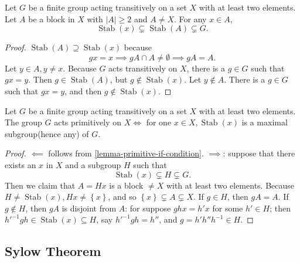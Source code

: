 \begin{lemma}
  \label{lemma-primitive-if-condition}
  Let \( G \) be a finite group acting transitively on a set \( X \) with at least two elements.
  Let \( A \) be a block in \( X \) with \( \left\vert A \right\vert \geq 2 \) and \( A \neq X \).
  For any \( x \in A \),
  \[
    \operatorname{Stab}(x) \subsetneq \operatorname{Stab}(A) \subsetneq G.
  \]
\end{lemma}
\begin{proof}
  \( \operatorname{Stab}(A) \supseteq \operatorname{Stab}(x) \) because
  \[
    gx = x \implies gA \cap A \neq \emptyset \implies gA = A.
  \]
  Let \( y \in A, y \neq x \).
  Because \( G \) acts transitively on \( X \), there is a \( g \in G \) such that \( gx = y \).
  Then \( g \in \operatorname{Stab}(A) \), but \( g \notin \operatorname{Stab}(x) \).
  Let \( y \notin A \).
  There is a \( g \in G \) such that \( gx = y \), and then \( g \notin \operatorname{Stab}(x) \).
\end{proof}

\begin{theorem}
  \label{theorem-primitive-if-condition}
  Let \( G \) be a finite group acting transitively on a set \( X \) with at least two elements.
  The group \( G \) acts primitively on \( X \iff \) for one \( x \in X, \operatorname{Stab}(x) \) is a maximal subgroup(hence any) of \( G \).
\end{theorem}
\begin{proof}
  \( \impliedby \) follows from \ref{lemma-primitive-if-condition}.
  \( \implies \): suppose that there exists an \( x \) in \( X \) and a subgroup \( H \) such that
  \[
    \operatorname{Stab}(x) \subsetneq H \subsetneq G.
  \]
    Then we claim that \( A = Hx \) is a block \( \neq X \) with at least two elements.
    Because \( H \neq \operatorname{Stab}(x), Hx \neq \left\lbrace x \right\rbrace \), and so \( \left\lbrace x \right\rbrace \subsetneq A \subsetneq X \).
    If \( g \in H \), then \( gA = A \).
    If \( g \notin H \), then \( gA \) is disjoint from \( A \): for suppose \( ghx = h' x \) for some \( h' \in H \);
    then \( h'^{-1}gh \in \operatorname{Stab}(x) \subseteq H \), say \( h'^{-1}gh = h'' \), and \( g = h'h''h^{-1} \in H \).
\end{proof}

\subsection{Sylow Theorem}
\label{subsection-sylow-theorem}


